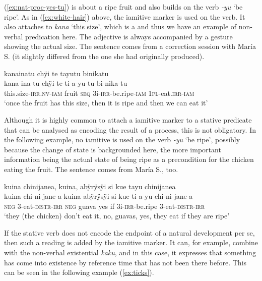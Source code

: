 (\ref{ex:nat-proc-yes-tu}) is about a ripe fruit and also builds on the verb \textit{-yu} ‘be ripe’. As in (\ref{ex:white-hair}) above, the iamitive marker is used on the verb. It also attaches to \textit{kana} ‘this size’, which is a  and thus we have an example of non-verbal predication here. The adjective is always accompanied by a gesture showing the actual size. The sentence comes from a correction session with María S. (it slightly differed from the one she had originally produced).

\ea\label{ex:nat-proc-yes-tu}
\begingl
\glpreamble kanainatu chÿi te tayutu binikatu\\
\gla kana-ina-tu chÿi te ti-a-yu-tu bi-nika-tu\\
\glb this.size-\textsc{irr.nv}-\textsc{iam} fruit \textsc{seq} 3i-\textsc{irr}-be.ripe-\textsc{iam} 1\textsc{pl}-eat.\textsc{irr}-\textsc{iam}\\
\glft ‘once the fruit has this size, then it is ripe and then we can eat it’
\endgl
\trailingcitation{[rxx-e121128s-3.11]}
\xe

Although it is highly common to attach a iamitive marker to a stative predicate that can be analysed as encoding the result of a process, this is not obligatory. In the following example, no iamitive is used on the verb \textit{-yu} ‘be ripe’, possibly because the change of state is backgrounded here, the more important information being the actual state of being ripe as a precondition for the chicken eating the fruit. %
The sentence comes from María S., too.

\ea\label{ex:nat-proc-no-tu}
\begingl 
\glpreamble kuina chinijanea, kuina, abÿrÿsÿi si kue tayu chinijanea\\
\gla kuina chi-ni-jane-a kuina abÿrÿsÿi si kue ti-a-yu chi-ni-jane-a\\ 
\glb \textsc{neg} 3-eat-\textsc{distr}-\textsc{irr} \textsc{neg} guava yes if 3i-\textsc{irr}-be.ripe 3-eat-\textsc{distr}-\textsc{irr}\\ 
\glft ‘they (the chicken) don’t eat it, no, guavas, yes, they eat if they are ripe’\\ 
\endgl
\trailingcitation{[rxx-e121126s-3.36]}
\xe

If the stative verb does not encode the endpoint of a natural development per se, then such a reading is added by the iamitive marker.  It can, for example, combine with the non-verbal existential  \textit{kaku}, and in this case, it expresses that something has come into existence by reference time that has not been there before. This can be seen in the following example (\ref{ex:ticks}).

